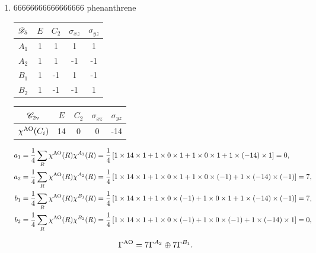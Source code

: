 \documentclass[a4paper]{book}
\newcommand{\AO}{{\rm AO}}
\begin{document}
\begin{solution}
\begin{enumerate}[label=(\alph*)]
		
		
		
		\item 66666666666666666	phenanthrene
		
		\begin{center}
		\begin{tabular}{ccccc}\hline
	$\mathscr{D}_{\rm 5}$ & $E$ & $C_2$ &	$\sigma_{xz}$	& $\sigma_{yz}$\\ \hline
			$A_1$	&	1	&	1	&	1	&	1	\\
			$A_2$	&	1	&	1	&	-1	&	-1	\\
			$B_1$ 	&	1	&	-1	&	1	&	-1	\\
			$B_2$ 	&	1	&	-1	&	-1	&	1	\\ \hline
		\end{tabular}
		\end{center}
		
		
		\begin{center}
		\begin{tabular}{ccccc}\hline
	$\mathscr{C}_{\rm 2v}$	& $E$ & $C_2$ &	$\sigma_{xz}$	& $\sigma_{yz}$ \\ \hline
	$\chi^{\AO}(C_i)$	&	14	&	0	&	0	&	-14	\\ \hline
		\end{tabular}
		\end{center}
			
		\begin{align*}
		a_1 &= \frac{1}{4} \sum_{R} \chi^{\AO}(R) \chi^{A_1}(R) = \frac{1}{4} \left[ 1 \times 14 \times 1 + 1 \times 0 \times 1 + 1 \times 0 \times 1 + 1 \times (-14) \times 1 \right] = 0, \\		
		a_2 &= \frac{1}{4} \sum_{R} \chi^{\AO}(R) \chi^{A_2}(R) = \frac{1}{4} \left[ 1 \times 14 \times 1 + 1 \times 0 \times 1 + 1 \times 0 \times (-1) + 1 \times (-14) \times (-1) \right] = 7, \\
		b_1 &= \frac{1}{4} \sum_{R} \chi^{\AO}(R) \chi^{B_1}(R) = \frac{1}{4} \left[ 1 \times 14 \times 1 + 1 \times 0 \times (-1) + 1 \times 0 \times 1 + 1 \times (-14) \times (-1) \right] = 7, \\
		b_2 &= \frac{1}{4} \sum_{R} \chi^{\AO}(R) \chi^{B_2}(R) = \frac{1}{4} \left[ 1 \times 14 \times 1 + 1 \times 0 \times (-1) + 1 \times 0 \times (-1) + 1 \times (-14) \times 1 \right] = 0, \\
		\end{align*}
		
		\begin{equation*}
			\Gamma^{\AO} = 7\Gamma^{A_2} \oplus 7\Gamma^{B_1}.
		\end{equation*}
		

\end{enumerate}
\end{solution}
\end{document}
